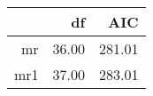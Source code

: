 \begin{table}[ht]
\centering
\begin{tabular}{rrr}
  \hline
 & df & AIC \\ 
  \hline
mr & 36.00 & 281.01 \\ 
  mr1 & 37.00 & 283.01 \\ 
   \hline
\end{tabular}
\end{table}
